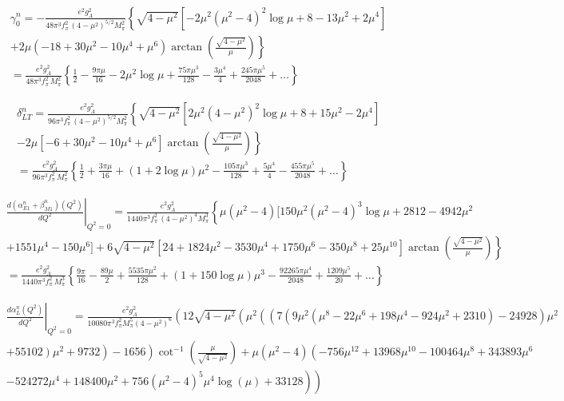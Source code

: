 \documentclass[prc,twocolumn,showpacs,preprintnumbers,amsmath,amssymb
,superscriptaddress,a4paper,nofootinbib
]{revtex4-1}
\begin{document}
\begin{widetext}
{\begin{align}
&\gamma_0^n = -\frac{e^2 g_A^2}{48\pi^3 f_\pi^2\,  (4-\mu^2)^{5/2} M_\pi^2} \left\{ \sqrt{4-\mu^2} [ -2\mu^2(\mu^2-4)^2  \log\mu + 8 - 13 \mu^2 + 2 \mu^4 ] \right. \nonumber\\
&\left. + 2 \mu (-18  + 30 \mu^2 - 10 \mu^4 + \mu^6) \arctan\left( \frac{\sqrt{4-\mu^2}}{\mu}\right) \right\}\nonumber \\
&=\frac{e^2 g_A^2}{48\pi^3 f_\pi^2\,  M_\pi^2}\left\{ \frac{1}{2}-\frac{9\pi \mu}{16} -  2\mu^2 \log\mu  + \frac{75 \pi \mu^3}{128} - \frac{3 \mu^4}{4} + \frac{245 \pi \mu^5}{2048} + \dots \right\}
\end{align}


\begin{align}
&\delta^n_{LT} = \frac{e^2 g_A^2}{96\pi^3 f_\pi^2\, (4-\mu^2)^{5/2} M_\pi^2} \left\{ \sqrt{4-\mu^2} [ 2 \mu^2 (4-\mu^2)^2  \log\mu + 8+15 \mu^2 -2 \mu^4] \nonumber \right.\\
&\left.  - 2 \mu [-6 +30 \mu^2 -10\mu^4 + \mu^6] \arctan\left( \frac{\sqrt{4-\mu^2}}{\mu} \right)      \right\}\nonumber \\
&=\frac{e^2 g_A^2}{96\pi^3 f_\pi^2\, M_\pi^2} \left\{ \frac{1}{2} + \frac{3 \pi \mu}{16} + \left(1+2\log\mu\right)\mu^2 - \frac{105 \pi \mu^3}{128} + \frac{5\mu^4}{4}  - \frac{455 \pi \mu^5}{2048} + \dots\right\} 
\end{align}


\begin{align}
&\left.\frac{d(\alpha_{E1}^n+\beta_{M1}^n) (Q^2)}{dQ^2}\right|_{Q^2=0}=\frac{e^2 g_A^2}{1440 \pi^3 f_\pi^2\,  (4-\mu^2)^{4} M_\pi^3}\left\{ \mu(\mu^2-4) [150\mu^2 (\mu^2-4)^3  \log\mu +2812-4942 \mu^2\right. \nonumber \\
&\left. + 1551 \mu^4-150 \mu^6]  + 6 \sqrt{4-\mu^2}[24+1824 \mu^2 - 3530 \mu^4 + 1750 \mu^6 -350 \mu^8 + 25 \mu^{10}] \arctan\left( \frac{\sqrt{4-\mu^2}}{\mu}\right) \right\} \nonumber \\
&= \frac{e^2 g_A^2}{1440 \pi^3 f_\pi^2\,  M_\pi^3} \left\{  \frac{9 \pi}{16} -\frac{89 \mu}{2} + \frac{5535 \pi \mu^2}{128} + \left( 1+ 150 \log\mu\right)\mu^3 -\frac{92265  \pi \mu^4}{2048}  +  \frac{1209 \mu^5}{20} +\dots  \right\}
\end{align}



\begin{align}
&\left.\frac{d\alpha_{L}^n (Q^2)}{dQ^2}\right|_{Q^2=0}=\frac{e^2 g_A^2}{10080 \pi ^3 f_\pi^2 M_\pi^5 \left(4-\mu ^2\right)^6
   } \left(12 \sqrt{4-\mu ^2} \left(\mu ^2 \left(\left(7 \left(9 \mu ^2 \left(\mu ^8-22 \mu ^6+198 \mu ^4-924 \mu
   ^2+2310\right)-24928\right) \mu ^2 \right.\right.\right.\right.\nonumber \\ 
&  \left. \left.\left.+55102\right) \mu ^2+9732\right)-1656\right) \cot ^{-1}\left(\frac{\mu }{\sqrt{4-\mu
   ^2}}\right)+\mu  \left(\mu ^2-4\right) \left(-756 \mu ^{12}+13968 \mu ^{10}-100464 \mu ^8+343893 \mu ^6 \right.\nonumber \\
&   \left.\left.-524272 \mu ^4+148400 \mu
   ^2+756 \left(\mu ^2-4\right)^5 \mu ^4 \log (\mu )+33128\right)\right)
\end{align}


}
\end{widetext}
\end{document}
